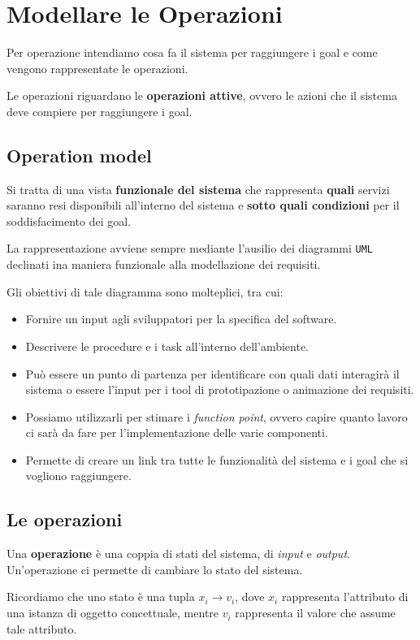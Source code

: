 \chapter{Modellare le Operazioni}
Per operazione intendiamo cosa fa il sistema per raggiungere i goal e 
come vengono rappresentate le operazioni.

Le operazioni riguardano le \textbf{operazioni attive}, ovvero le azioni
che il sistema deve compiere per raggiungere i goal.

\section{Operation model}
Si tratta di una vista \textbf{funzionale del sistema} che rappresenta \textbf{quali} 
servizi saranno resi disponibili all'interno del sistema e \textbf{sotto quali 
condizioni} per il soddisfacimento dei goal.

La rappresentazione avviene sempre mediante l'ausilio dei diagrammi \texttt{UML}
declinati ina maniera funzionale alla modellazione dei requisiti.

Gli obiettivi di tale diagramma sono molteplici, tra cui:
\begin{itemize}
    \item Fornire un input agli sviluppatori per la specifica del software.
    \item Descrivere le procedure e i task all'interno dell'ambiente.
    \item Può essere un punto di partenza per identificare con quali dati 
    interagirà il sistema o essere l'input per i tool di prototipazione o 
    animazione dei requisiti.
    \item Possiamo utilizzarli per stimare i \textit{function point}, ovvero 
    capire quanto lavoro ci sarà da fare per l'implementazione delle varie 
    componenti.
    \item Permette di creare un link tra tutte le funzionalità del sistema e 
    i goal che si vogliono raggiungere.
\end{itemize}

\section{Le operazioni}
\begin{tcolorbox}[colback=violet!5!white,colframe=violet!75!black, title=Operazione]
    Una \textbf{operazione} è una coppia di stati del sistema, di \textit{input} e 
    \textit{output}. Un'operazione ci permette di cambiare lo stato del sistema.
\end{tcolorbox}
Ricordiamo che uno stato è una tupla $x_i \rightarrow v_i$, dove $x_i$ rappresenta 
l'attributo di una istanza di oggetto concettuale, mentre $v_i$ rappresenta il valore che 
assume tale attributo.

